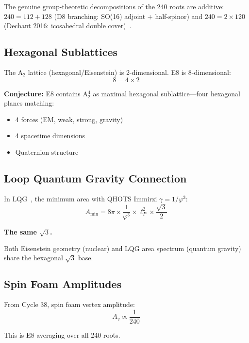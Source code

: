 \documentclass[aps,prd,twocolumn,superscriptaddress,floatfix,nofootinbib]{revtex4-2}
\theoremstyle{definition}
\theoremstyle{remark}
\newcommand{\vp}{\varphi}
\begin{document}
The genuine group-theoretic decompositions of the 240 roots are additive:
$240 = 112 + 128$ (D8 branching: SO(16) adjoint + half-spinor) and
$240 = 2 \times 120$ (Dechant 2016: icosahedral double cover)~\cite{dechant}.

\subsection{Hexagonal Sublattices}

The A$_2$ lattice (hexagonal/Eisenstein) is 2-dimensional. E8 is 8-dimensional:
\begin{equation}
8 = 4 \times 2
\end{equation}

\textbf{Conjecture:} E8 contains A$_2^4$ as maximal hexagonal sublattice---four hexagonal planes matching:
\begin{itemize}
\item 4 forces (EM, weak, strong, gravity)
\item 4 spacetime dimensions
\item Quaternion structure
\end{itemize}

\subsection{Loop Quantum Gravity Connection}

In LQG~\cite{lqg}, the minimum area with QHOTS Immirzi $\gamma = 1/\vp^3$:
\begin{equation}
A_{\min} = 8\pi \times \frac{1}{\vp^3} \times \ell_P^2 \times \frac{\sqrt{3}}{2}
\end{equation}

\textbf{The same $\sqrt{3}$.}

Both Eisenstein geometry (nuclear) and LQG area spectrum (quantum gravity) share the hexagonal $\sqrt{3}$ base.

\subsection{Spin Foam Amplitudes}

From Cycle 38, spin foam vertex amplitude:
\begin{equation}
A_v \propto \frac{1}{240}
\end{equation}

This is E8 averaging over all 240 roots.

\end{document}
